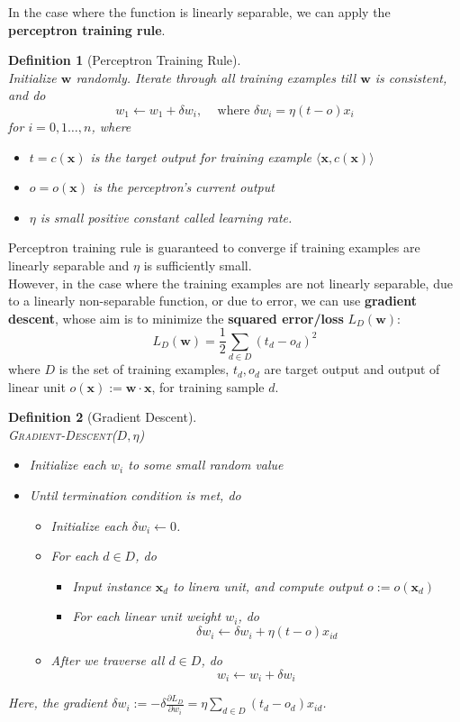 \documentclass[12pt]{article}
\newtheorem{definition}{Definition}[section]
\theoremstyle{definition}
\begin{document}
In the case where the function is linearly separable, we can apply the \textbf{perceptron training rule}.
\begin{definition}[Perceptron Training Rule]
\hfill\\\normalfont Initialize $\mathbf{w}$ randomly. Iterate through all training examples till $\mathbf{w}$ is consistent, and do
\[
w_1\leftarrow w_1+\delta w_i,\;\;\;\text{ where }\delta w_i = \eta(t-o)x_i
\]
for $i=0,1\ldots, n$, where
\begin{itemize}
	\item $t=c(\mathbf{x})$ is the target output for training example $\langle \mathbf{x}, c(\mathbf{x})\rangle$
	\item $o=o(\mathbf{x})$ is the perceptron's current output
	\item $\eta$ is small positive constant called learning rate.
\end{itemize}
\end{definition}
Perceptron training rule is guaranteed to converge if training examples are linearly separable and $\eta$ is sufficiently small.\\
However, in the case where the training examples are not linearly separable, due to a linearly non-separable function, or due to error, we can use \textbf{gradient descent}, whose aim is to minimize the \textbf{squared error/loss} $L_D(\mathbf{w})$:
\[
L_D(\mathbf{w})=\frac{1}{2}\sum_{d\in D}(t_d-o_d)^2
\]
where $D$ is the set of training examples, $t_d, o_d$ are target output and output of linear unit $o(\mathbf{x}):=\mathbf{w}\cdot \mathbf{x}$, for training sample $d$.
\begin{definition}[Gradient Descent]
\hfill\\\normalfont \textsc{Gradient-Descent}($D,\eta$)\\
\begin{itemize}
\item Initialize each $w_i$ to some small random value
\item Until termination condition is met, do
\begin{itemize}
\item Initialize each $\delta w_i\leftarrow 0$.
\item For each $d\in D$, do
\begin{itemize}
\item Input instance $\mathbf{x}_d$ to linera unit, and compute output $o:=o(\mathbf{x}_d)$
\item For each linear unit weight $w_i$, do
\[
\delta w_i\leftarrow \delta w_i + \eta(t-o)x_{id}
\]
\end{itemize}
\item After we traverse all $d\in D$, do
\[
w_i\leftarrow w_i+\delta w_i
\]
\end{itemize}
\end{itemize}
Here, the gradient $\delta w_i:=-\delta \frac{\partial L_D}{\partial w_i}=\eta\sum_{d\in D}(t_d-o_d)x_{id}$.
\end{definition}
\end{document}
